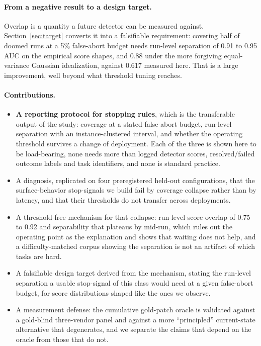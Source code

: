 \documentclass[sigconf,screen]{acmart}
\begin{document}
\paragraph{From a negative result to a design target.} Overlap is a quantity a future detector can
be measured against. Section~\ref{sec:target} converts it into a falsifiable requirement: covering
half of doomed runs at a 5\% false-abort budget needs run-level separation of 0.91 to 0.95 AUC on
the empirical score shapes, and 0.88 under the more forgiving equal-variance Gaussian
idealization, against 0.617 measured here. That is a large improvement, well beyond what threshold tuning reaches.

\paragraph{Contributions.}
\begin{itemize}
\item \textbf{A reporting protocol for stopping rules}, which is the transferable output of the
study: coverage at a stated false-abort budget, run-level separation with an instance-clustered
interval, and whether the operating threshold survives a change of deployment. Each of the three is
shown here to be load-bearing, none needs more than logged detector scores, resolved/failed outcome
labels and task identifiers, and none is standard practice.
\item A diagnosis, replicated on four preregistered held-out configurations, that the
surface-behavior stop-signals we build fail by coverage collapse rather than by latency, and that
their thresholds do not transfer across deployments.
\item A threshold-free mechanism for that collapse: run-level score overlap of 0.75 to 0.92 and
separability that plateaus by mid-run, which rules out the operating point as the explanation and
shows that waiting does not help, and a difficulty-matched corpus showing the separation is not an
artifact of which tasks are hard.
\item A falsifiable design target derived from the mechanism, stating the run-level separation a
usable stop-signal of this class would need at a given false-abort budget, for score distributions
shaped like the ones we observe.
\item A measurement defense: the cumulative gold-patch oracle is validated against a gold-blind
three-vendor panel and against a more ``principled'' current-state alternative that degenerates,
and we separate the claims that depend on the oracle from those that do not.
\end{itemize}
\end{document}
